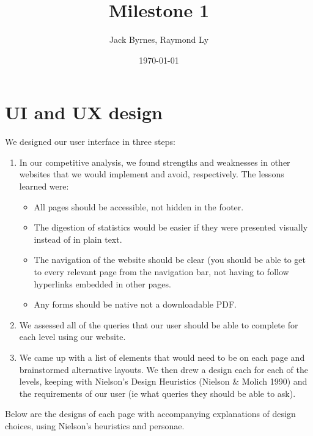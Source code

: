 \documentclass[12pt, a4paper]{article}
\title{Milestone 1}
\author{Jack Byrnes, Raymond Ly}
\date{\today}
\begin{document}
\maketitle
\tableofcontents
\section{UI and UX design}
We designed our user interface in three steps:
\begin{enumerate}
\item In our competitive analysis, we found strengths and weaknesses in other websites that we would implement and avoid, respectively. 
The lessons learned were:
\begin{itemize}
\item All pages should be accessible, not hidden in the footer. 
\item The digestion of statistics would be easier if they were presented visually instead of in plain text. 
\item The navigation of the website should be clear (you should be able to get to every relevant page from the navigation bar, not having to follow hyperlinks embedded in other pages. 
\item Any forms should be native not a downloadable PDF. 
\end{itemize}
\item We assessed all of the queries that our user should be able to complete for each level using our website.
\item We came up with a list of elements that would need to be on each page and brainstormed alternative layouts. We then drew a design each for each of the levels, keeping with Nielson's Design Heuristics (Nielson \& Molich 1990) and the requirements of our user (ie what queries they should be able to ask).
\end{enumerate}
Below are the designs of each page with accompanying explanations of design choices, using Nielson's heuristics and personae.
\end{document}

